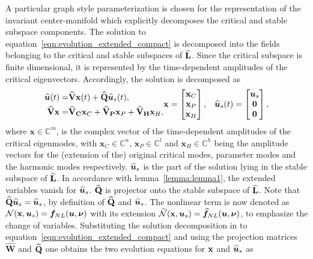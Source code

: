 A particular graph style parameterization is chosen for the representation of the invariant center-manifold which explicitly decomposes the critical and stable subspace components. The solution to equation~\eqref{eqn:evolution_extended_compact} is decomposed into the fields belonging to the critical and stable subspaces of $\mathbf{\widehat{L}}$. Since the critical subspace is finite dimensional, it is represented by the time-dependent amplitudes of the critical eigenvectors. Accordingly, the solution is decomposed as
\begin{subequations}
	\begin{align}
		\efield{u}(t) =& \mathbf{\widehat{V}}\mathbf{x}(t) + \Qhat\efield{u}_{s}(t), \\
		\mathbf{\widehat{V}}\mathbf{x} =& \mathbf{\widehat{V}_{C}}\mathbf{x}_{C} + \mathbf{\widehat{V}_{P}}\mathbf{x}_{P} + \mathbf{\widehat{V}_{H}}\mathbf{x}_{H},  	
	\end{align}
	\begin{align}
		\mathbf{x} = \begin{bmatrix}
			\mathbf{x}_{C} \\
			\mathbf{x}_{P} \\
			\mathbf{x}_{H} 
		\end{bmatrix}, &&
		\efield{u}_{s}(t) = \begin{bmatrix}
			\vfield{u}_{s} \\
			\veczero \\
			\veczero 
		\end{bmatrix}, \nonumber
	\end{align} 
\end{subequations}
where $\mathbf{x} \in \mathds{C}^{m}$, is the complex vector of the time-dependent amplitudes of the critical eigenmodes, with $\mathbf{x}_{C}\in\mathds{C}^{n}$, $\mathbf{x}_{P}\in\mathds{C}^{l}$ and $\mathbf{x}_{H}\in\mathds{C}^{h}$ being the amplitude vectors for the (extension of the) original critical modes, parameter modes and the harmonic modes respectively. ${\widehat{\boldsymbol{u}}}_{s}$ is the part of the solution lying in the stable subspace of $\mathbf{\widehat{L}}$. In accordance with lemma~\ref{lemma:lemma1}, the extended variables vanish for ${\widehat{\boldsymbol{u}}}_{s}$. $\mathbf{\widehat{Q}}$ is projector onto the stable subspace of $\mathbf{\widehat{L}}$. Note that $\mathbf{\widehat{Q}}{\widehat{\boldsymbol{u}}}_{s} = {\widehat{\boldsymbol{u}}}_{s}$, by definition of $\mathbf{\widehat{Q}}$ and ${\widehat{\boldsymbol{u}}}_{s}$. The nonlinear term is now denoted as $\mathcal{N}(\mathbf{x},\boldsymbol{u}_{s}) = \boldsymbol{f}_{NL}(\boldsymbol{u},\boldsymbol{\nu})$ with its extension $\mathcal{\widehat{N}}(\mathbf{x},\boldsymbol{u}_{s}) = {\widehat{\boldsymbol{f}}}_{NL}(\boldsymbol{u},\boldsymbol{\nu})$, to emphasize the change of variables. Substituting the solution decomposition in to equation~\eqref{eqn:evolution_extended_compact} and using the projection matrices $\mathbf{\widehat{W}}$ and $\mathbf{\widehat{Q}}$ one obtains the two evolution equations for $\mathbf{x}$ and ${\widehat{\boldsymbol{u}}}_{s}$ as
